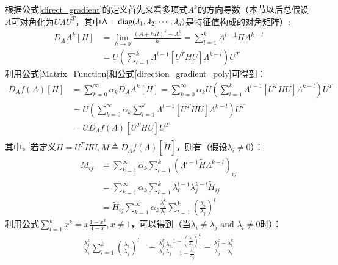 根据公式\ref{direct_gradient}的定义首先来看多项式$A^{k}$的方向导数（本节以后总假设$A$可对角化为$U\Lambda U^{T}$，其中$\Lambda={\rm diag}(\lambda_1,\lambda_2,\cdots,\lambda_d)$是特征值构成的对角矩阵）:
\begin{equation}
\label{direction_gradient_poly}
\begin{split}
D_{A}A^{k}[H]&=\lim_{h\rightarrow 0}\frac{(A+hH)^{k}-A^{k}}{h}=\sum_{l=1}^{k}A^{l-1}HA^{k-l}\\
&=U\left(\sum_{l=1}^{k}\Lambda^{l-1}[U^{T}HU]\Lambda^{k-l}\right)U^{T}
\end{split}
\end{equation}
利用公式\ref{Matrix_Function}和公式\ref{direction_gradient_poly}可得到：
\begin{equation}
\label{direction_gradient_fx}
\begin{split}
D_{A}f(A)[H]&=\sum_{k=0}^{\infty}\alpha_{k}D_{A}A^{k}[H]=\sum_{k=0}^{\infty}\alpha_{k}U\left(\sum_{l=1}^{k}\Lambda^{l-1}[U^{T}HU]\Lambda^{k-l}\right)U^{T}\\
&=U\left(\sum_{k=0}^{\infty}\alpha_{k}\sum_{l=1}^{k}\Lambda^{l-1}[U^{T}HU]\Lambda^{k-l}\right)U^{T}\\
&=UD_{\Lambda}f(\Lambda)[U^{T}HU]U^{T}\\
\end{split}
\end{equation}
其中，若定义$\tilde{H}=U^{T}HU,M\triangleq D_{\Lambda}f(\Lambda)[\tilde{H}]$，则有（假设$\lambda_{i} \neq 0$）：
\begin{equation}
\label{direction_gradient_M}
\begin{split}
M_{ij}&=\sum_{k=1}^{\infty} \alpha_{k}\sum_{l=1}^{k}(\Lambda^{l-1}\tilde{H}\Lambda^{k-l})_{ij}\\
&=\sum_{k=1}^{\infty} \alpha_{k}\sum_{l=1}^{k}\lambda_{i}^{l-1}\lambda_{j}^{k-l}\tilde{H}_{ij}\\
&=\tilde{H}_{ij}\sum_{k=1}^{\infty}\alpha_{k}\frac{\lambda_{j}^{k}}{\lambda_{i}}\sum_{l=1}^{k}\left(\frac{\lambda_i}{\lambda_j}\right)^{l}
\end{split}
\end{equation}
利用公式$\sum_{l=1}^{k}x^{k}=x\frac{1-x^{k}}{1-x},x \neq 1$，可以得到（当$\lambda_{i}\neq\lambda_{j}\text{ and }\lambda_i \neq 0$时）：
\begin{equation}
\label{Compute_Zij_1}
\begin{split}
\frac{\lambda_{j}^{k}}{\lambda_{i}}\sum_{l=1}^{k}\left(\frac{\lambda_i}{\lambda_j}\right)^{l}&=\frac{\lambda_{j}^{k}}{\lambda_{i}}\frac{\lambda_{i}}{\lambda_{j}}\frac{1-\left(\frac{\lambda_{i}}{\lambda_{j}}\right)^{k}}{1-\frac{\lambda_{i}}{\lambda_{j}}}=\frac{\lambda_{j}^{k}-\lambda_{i}^{k}}{\lambda_{j}-\lambda_{i}}
\end{split}
\end{equation}
